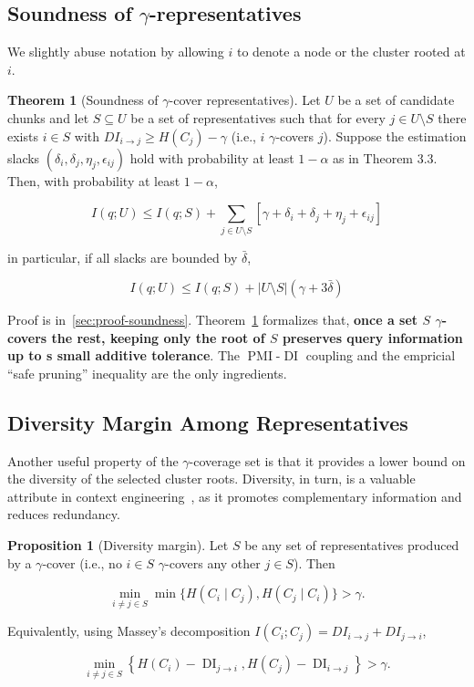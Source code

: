 \documentclass{article} %
\theoremstyle{definition}
\newtheorem{theorem}{Theorem}[section]
\newtheorem{proposition}{Proposition}[section]
\DeclareMathOperator{\DI}{DI}
\DeclareMathOperator{\PMI}{PMI}
\begin{document}
\subsection{Soundness of $\gamma$-representatives}

We slightly abuse notation by allowing $i$ to denote a node or the cluster rooted at $i$.

\begin{theorem}[Soundness of $\gamma$-cover representatives]
\label{thm:soundness}
Let $U$ be a set of candidate chunks and let $S\subseteq U$ be a set of representatives such that for every $j\in U\setminus S$ there exists $i\in S$ with $DI_{i\to j}\ge H(C_j)-\gamma$ (i.e., $i$ $\gamma$-covers $j$). Suppose the estimation slacks $(\delta_i,\delta_j,\eta_j,\epsilon_{ij})$ hold with probability at least $1-\alpha$ as in Theorem 3.3. Then, with probability at least $1-\alpha$,

$$ I(q; U) \le I(q; S) + \sum_{j\in U\setminus S}[\gamma + \delta_{i} + \delta_j + \eta_j + \epsilon_{ij}]$$

in particular, if all slacks are bounded by $\bar\delta$,

$$ I(q; U) \le I(q; S) + \lvert U \setminus S \rvert (\gamma + 3 \bar{\delta})$$

\end{theorem}

Proof is in~\ref{sec:proof-soundness}. Theorem~\ref{thm:soundness} formalizes that, \textbf{once a set $S$ $\gamma$-covers the rest, keeping only the root of $S$ preserves query information up to s small additive tolerance}. The $\PMI$-$\DI$ coupling and the empricial ``safe pruning'' inequality are the only ingredients.

\subsection{Diversity Margin Among Representatives}

Another useful property of the $\gamma$-coverage set is that it provides a lower bound on the diversity of the selected cluster roots. Diversity, in turn, is a valuable attribute in context engineering~\citep{lewis2020retrieval,zamani2018joint,carbonell1998mmr}, as it promotes complementary information and reduces redundancy.

\begin{proposition}[Diversity margin]
\label{prop:diversity}
Let $S$ be any set of representatives produced by a $\gamma$-cover (i.e., no $i\in S$ $\gamma$-covers any other $j\in S$). Then

$$\min_{i\ne j\in S} \min\{H(C_i\mid C_j), H(C_j\mid C_i)\} > \gamma.$$

Equivalently, using Massey's decomposition $I(C_i;C_j)=DI_{i\to j}+DI_{j\to i}$,

$$\min_{i\ne j\in S} \left\{ H(C_i) -\DI_{j\to i}, H(C_j) -\DI_{i\to j}\right\} > \gamma.$$
\end{proposition}
\end{document}
